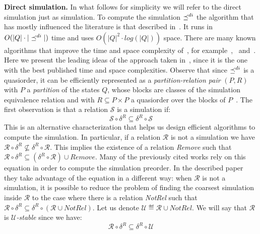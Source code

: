 \textbf{Direct simulation.}
In what follows for simplicity we will refer to the direct simulation just as simulation.
To compute the simulation $\preceq^{di}$ the algorithm that has mostly influenced
the literature is that described in~\cite{henzinger1995computing}.
It runs in $O(|Q| \cdot |\preceq^{di}|)$ time and uses $O(|Q|^2 \cdot log(|Q|))$ space.
There are many known algorithms that improve the time and space complexity of~\cite{henzinger1995computing},
for example~\cite{bustan2003simulation},~\cite{ranzato2007new} and~\cite{crafa2011saving}.
Here we present the leading ideas of the approach taken in~\cite{cece2017foundation},
since it is the one with the best published time and space complexities.
Observe that since $\preceq^{di}$ is a quasiorder, it can be efficiently represented as a \emph{partition-relation pair}
$(P,R)$ with $P$ a \emph{partition} of the states $Q$, whose blocks are classes
of the simulation equivalence relation and with $R \subseteq P \times P$ a quasiorder
over the blocks of $P$~\cite{cece2017foundation}.
The first observation is that a relation $\mathscr{S}$ is a simulation if:
\[ \mathscr{S} \circ \delta^{R} \subseteq \delta^{R} \circ \mathscr{S} \]
This is an alternative characterization that helps us design efficient algorithms
to compute the simulation.
In particular, if a relation $\mathscr{R}$ is not a simulation we have
$\mathscr{R} \circ \delta^{R} \nsubseteq \delta^R \circ \mathscr{R}$.
This implies the existence of a relation \emph{Remove} such that
$\mathscr{R} \circ \delta^R \subseteq (\delta^R \circ \mathscr{R}) \cup Remove $.
Many of the previously cited works rely on this equation in order to compute
the simulation preorder.
In the described paper they take advantage of the equation in a different way:
when $\mathscr{R}$ is not a simulation, it is possible to reduce the problem of
finding the coarsest simulation inside $\mathscr{R}$ to the case where there
is a relation \emph{NotRel} such that $\mathscr{R} \circ \delta^R \subseteq \delta^R \circ (\mathscr{R} \cup NotRel)$.
Let us denote $\mathscr{U} \eqdef \mathscr{R} \cup NotRel$.
We will say that $\mathscr{R}$ is $\mathscr{U}$\emph{-stable} since we have:
\[\mathscr{R} \circ \delta^R \subseteq \delta^R \circ \mathscr{U}\]
